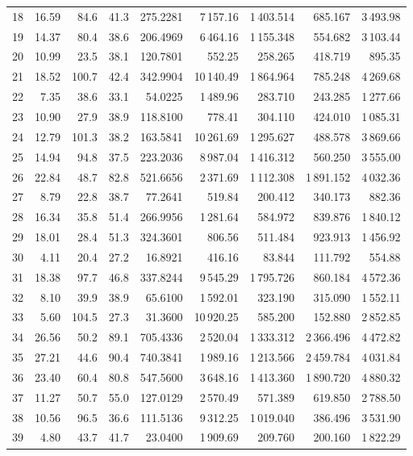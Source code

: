 \documentclass[12pt,letterpaper]{article}
\begin{document}
{\begin{longtable}{|c||r|r|r||r|r|r|r|r|}
18 & 16.59 & 84.6 & 41.3 & 275.2281 & 7\,157.16 & 1\,403.514 & 685.167 & 3\,493.98 \\
19 & 14.37 & 80.4 & 38.6 & 206.4969 & 6\,464.16 & 1\,155.348 & 554.682 & 3\,103.44 \\
20 & 10.99 & 23.5 & 38.1 & 120.7801 & 552.25 & 258.265 & 418.719 & 895.35 \\
21 & 18.52 & 100.7 & 42.4 & 342.9904 & 10\,140.49 & 1\,864.964 & 785.248 & 4\,269.68 \\
22 & 7.35 & 38.6 & 33.1 & 54.0225 & 1\,489.96 & 283.710 & 243.285 & 1\,277.66 \\
23 & 10.90 & 27.9 & 38.9 & 118.8100 & 778.41 & 304.110 & 424.010 & 1\,085.31 \\
24 & 12.79 & 101.3 & 38.2 & 163.5841 & 10\,261.69 & 1\,295.627 & 488.578 & 3\,869.66 \\
25 & 14.94 & 94.8 & 37.5 & 223.2036 & 8\,987.04 & 1\,416.312 & 560.250 & 3\,555.00 \\
26 & 22.84 & 48.7 & 82.8 & 521.6656 & 2\,371.69 & 1\,112.308 & 1\,891.152 & 4\,032.36 \\
27 & 8.79 & 22.8 & 38.7 & 77.2641 & 519.84 & 200.412 & 340.173 & 882.36 \\
28 & 16.34 & 35.8 & 51.4 & 266.9956 & 1\,281.64 & 584.972 & 839.876 & 1\,840.12 \\
29 & 18.01 & 28.4 & 51.3 & 324.3601 & 806.56 & 511.484 & 923.913 & 1\,456.92 \\
30 & 4.11 & 20.4 & 27.2 & 16.8921 & 416.16 & 83.844 & 111.792 & 554.88 \\
31 & 18.38 & 97.7 & 46.8 & 337.8244 & 9\,545.29 & 1\,795.726 & 860.184 & 4\,572.36 \\
32 & 8.10 & 39.9 & 38.9 & 65.6100 & 1\,592.01 & 323.190 & 315.090 & 1\,552.11 \\
33 & 5.60 & 104.5 & 27.3 & 31.3600 & 10\,920.25 & 585.200 & 152.880 & 2\,852.85 \\
34 & 26.56 & 50.2 & 89.1 & 705.4336 & 2\,520.04 & 1\,333.312 & 2\,366.496 & 4\,472.82 \\
35 & 27.21 & 44.6 & 90.4 & 740.3841 & 1\,989.16 & 1\,213.566 & 2\,459.784 & 4\,031.84 \\
36 & 23.40 & 60.4 & 80.8 & 547.5600 & 3\,648.16 & 1\,413.360 & 1\,890.720 & 4\,880.32 \\
37 & 11.27 & 50.7 & 55.0 & 127.0129 & 2\,570.49 & 571.389 & 619.850 & 2\,788.50 \\
38 & 10.56 & 96.5 & 36.6 & 111.5136 & 9\,312.25 & 1\,019.040 & 386.496 & 3\,531.90 \\
39 & 4.80 & 43.7 & 41.7 & 23.0400 & 1\,909.69 & 209.760 & 200.160 & 1\,822.29 \\

\end{longtable}}
\end{document}
